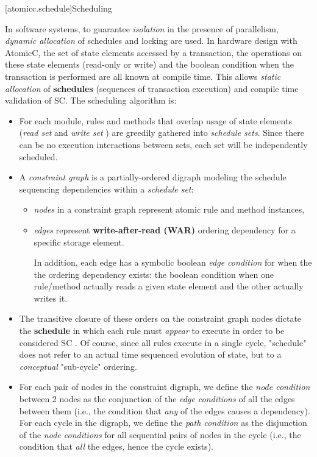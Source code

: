 [atomicc.schedule]{Scheduling}

In software systems, to guarantee \textit{isolation} in the presence of
parallelism, \textit{dynamic allocation}\cite[p.~377]{GrayR93} of schedules
and locking\cite[Sec.~11.2]{OV11} are used.
In hardware design with AtomicC,
the set of state elements accessed by a transaction,
the operations on these state elements (read-only or write)
and the boolean condition when the transaction is performed
are all known at compile time.
This allows \textit{static allocation}\cite[Sec.~7.3.1]{GrayR93} of \textbf{schedules}
(sequences of transaction execution)
and compile time validation of SC.
\newline
The scheduling algorithm is:
\begin{itemize}
\item For each module, rules and methods that overlap usage of state elements
(\textit{read set} and \textit{write set}\cite[Sec.~10.1.2]{OV11} \cite{RosenkrantzSternsLewis})
are greedily gathered into \textit{schedule sets}.
Since there can be no execution interactions between sets,
each set will be independently scheduled.
\item A \textit{constraint graph} is a partially-ordered digraph modeling
the schedule sequencing dependencies within a \textit{schedule set}:
\begin{itemize}
\item \textit{nodes} in a constraint graph represent atomic rule and method instances,
\item \textit{edges} represent \textbf{write-after-read (WAR)} ordering dependency
for a specific storage element\cite[Sec.~3]{Cain2003}.

In addition, each edge has a symbolic boolean \textit{edge condition} for when the
the ordering dependency exists: the boolean
condition when one rule/method actually reads a given state element
and the other actually writes it.
\end{itemize}

\item The transitive closure of these orders on the constraint graph nodes
dictate the \textbf{schedule} in which each rule must \textit{appear} to execute in
order to be considered SC
\cite[Sec.~11.1]{OV11}.
Of course, since all rules execute in a single cycle, "schedule" does not
refer to an actual time sequenced evolution of state,
but to a \textit{conceptual} "sub-cycle" ordering.

\item For each pair of nodes in the constraint digraph, we define the \textit{node condition}
between 2 nodes as the conjunction of the \textit{edge conditions} of all the edges between
them (i.e., the condition that \textit{any} of the edges causes a dependency).
For each cycle in the digraph, we define the \textit{path condition}
as the disjunction of the \textit{node conditions} for all sequential pairs of nodes
in the cycle (i.e., the condition that \textit{all} the edges, hence the cycle exists).


\end{itemize}

